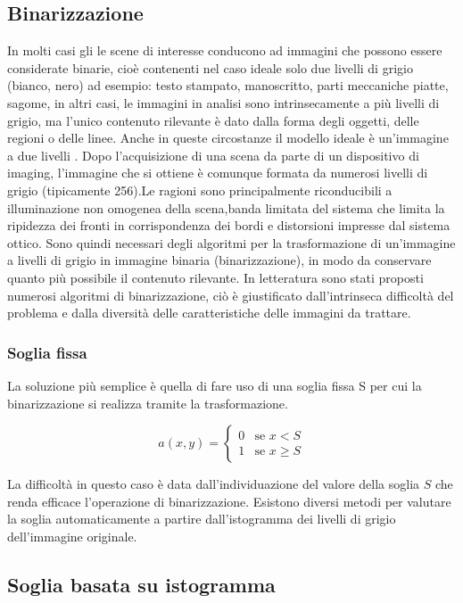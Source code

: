 \subsection{Binarizzazione} In molti casi gli le scene di interesse conducono
ad immagini che possono essere  considerate binarie, cioè contenenti nel caso
ideale solo due livelli di grigio (bianco, nero) ad esempio: testo stampato,
manoscritto, parti meccaniche piatte, sagome, in altri casi, le immagini in
analisi sono  intrinsecamente a più livelli di grigio, ma  l’unico contenuto
rilevante è dato dalla forma  degli oggetti, delle regioni o delle linee.
Anche in queste circostanze il modello ideale  è un’immagine a due livelli \cite{doi:10.1117/1.1631315}.
Dopo l’acquisizione di una scena da parte di un dispositivo di imaging,
l’immagine che si ottiene è comunque  formata da numerosi livelli di grigio
(tipicamente 256).Le ragioni sono principalmente riconducibili  a
illuminazione non omogenea della scena,banda limitata del sistema che limita
la ripidezza  dei fronti in corrispondenza dei bordi e distorsioni impresse
dal sistema ottico. Sono quindi necessari degli algoritmi per la
trasformazione di un’immagine a livelli di  grigio in immagine binaria
(binarizzazione), in  modo da conservare quanto più possibile il  contenuto
rilevante. In letteratura sono stati proposti numerosi  algoritmi di
binarizzazione, ciò è giustificato  dall’intrinseca difficoltà del problema e
dalla  diversità delle caratteristiche delle immagini  da trattare.


\subsubsection{Soglia fissa}

La soluzione più semplice è quella di fare uso 
di una soglia fissa S per cui la binarizzazione 
si realizza tramite la trasformazione.

\[
a(x,y) =
  \begin{cases}
   0       & \text{se } x < S \\
   1       & \text{se } x \geq S
  \end{cases}
\]

La difficoltà in questo caso è data  dall’individuazione del valore della
soglia $S$  che renda efficace l’operazione di  binarizzazione. Esistono
diversi metodi per valutare la soglia  automaticamente a partire
dall’istogramma  dei livelli di grigio dell’immagine originale.

\subsection{Soglia basata su istogramma}

